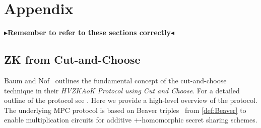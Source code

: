 \documentclass[11pt]{report}
\theoremstyle{definition}
\theoremstyle{plain}
\newcommand{\todo}[1]{{\color[rgb]{.5,0,0}\textbf{$\blacktriangleright$#1$\blacktriangleleft$}}}
\begin{document}
\cleardoublepage
{}




\cleardoublepage
\appendix
\chapter{Appendix}
\todo{Remember to refer to these sections correctly}

\section{ZK from Cut-and-Choose}\label{sec:zk-cut-and-choose}

Baum and Nof~\cite{baum2020concretely} outlines the fundamental concept of the cut-and-choose technique in their \textit{HVZKAoK Protocol using Cut and Choose}. For a detailed outline of the protocol see \cite[s3.2]{baum2020concretely}. Here we provide a high-level overview of the protocol. The underlying MPC protocol is based on Beaver triples~\cite{Beaver1992efficient} from \autoref{def:Beaver} to enable multiplication circuits for additive $+$-homomorphic secret sharing schemes.
\end{document}
